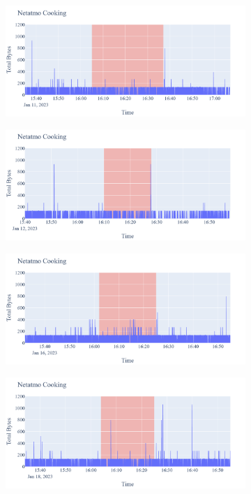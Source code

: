 \begin{figure}[H]
\begin{subfigure}[b]{0.5\textwidth}
        \centering
        \includegraphics[width=1.2\hsize]{figures/Netatmo_Cooking_Bytes_11.01.png}
    \end{subfigure}
    \begin{subfigure}[b]{0.5\textwidth}
        \centering
        \includegraphics[width=1.2\hsize]{figures/Netatmo_Cooking_Bytes_12.01.png}
    \end{subfigure}
    \begin{subfigure}[b]{0.5\textwidth}
        \centering
        \includegraphics[width=1.2\hsize]{figures/Netatmo_Cooking_Bytes_16.01.png}
    \end{subfigure}
    \begin{subfigure}[b]{0.5\textwidth}
        \centering
        \includegraphics[width=1.2\hsize]{figures/Netatmo_Cooking_Bytes_18.01.png}

\end{subfigure}
\end{figure}

